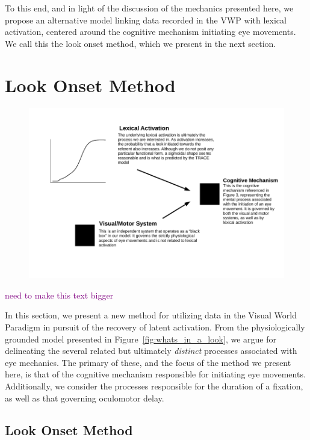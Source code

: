 \documentclass{article}
\providecommand{\cmt}[1]{\textcolor{purple}{#1}}
\begin{document}
To this end, and in light of the discussion of the mechanics presented here, we propose an alternative model linking data recorded in the VWP with lexical activation, centered around the cognitive mechanism initiating eye movements. We call this the look onset method, which we present in the next section.




\section{Look Onset Method}

\begin{figure}[H]
\centering
\includegraphics[scale=1]{black_box_system.pdf}
\end{figure}

\cmt{need to make this text bigger}

In this section, we present a new method for utilizing data in the Visual World Paradigm in pursuit of the recovery of latent activation. From the physiologically grounded model presented in Figure~\ref{fig:whats_in_a_look}, we argue for delineating the several related but ultimately \emph{distinct} processes associated with eye mechanics. The primary of these, and the focus of the method we present here, is that of the cognitive mechanism responsible for initiating eye movements. Additionally, we consider the processes responsible for the duration of a fixation, as well as that governing oculomotor delay.

\subsection{Look Onset Method}
\end{document}
